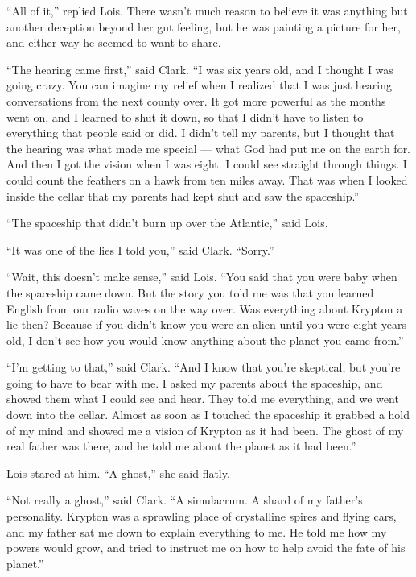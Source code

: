 ``All of it,'' replied Lois. There wasn't much reason to believe it was
anything but another deception beyond her gut feeling, but he was
painting a picture for her, and either way he seemed to want to share.

``The hearing came first,'' said Clark. ``I was six years old, and I
thought I was going crazy. You can imagine my relief when I realized
that I was just hearing conversations from the next county over. It got
more powerful as the months went on, and I learned to shut it down, so
that I didn't have to listen to everything that people said or did. I
didn't tell my parents, but I thought that the hearing was what made me
special --- what God had put me on the earth for. And then I got the
vision when I was eight. I could see straight through things. I could
count the feathers on a hawk from ten miles away. That was when I looked
inside the cellar that my parents had kept shut and saw the spaceship.''

``The spaceship that didn't burn up over the Atlantic,'' said Lois.

``It was one of the lies I told you,'' said Clark. ``Sorry.''

``Wait, this doesn't make sense,'' said Lois. ``You said that you were
baby when the spaceship came down. But the story you told me was that
you learned English from our radio waves on the way over. Was everything
about Krypton a lie then? Because if you didn't know you were an alien
until you were eight years old, I don't see how you would know anything
about the planet you came from.''

``I'm getting to that,'' said Clark. ``And I know that you're skeptical,
but you're going to have to bear with me. I asked my parents about the
spaceship, and showed them what I could see and hear. They told me
everything, and we went down into the cellar. Almost as soon as I
touched the spaceship it grabbed a hold of my mind and showed me a
vision of Krypton as it had been. The ghost of my real father was there,
and he told me about the planet as it had been.''

Lois stared at him. ``A ghost,'' she said flatly.

``Not really a ghost,'' said Clark. ``A simulacrum. A shard of my
father's personality. Krypton was a sprawling place of crystalline
spires and flying cars, and my father sat me down to explain everything
to me. He told me how my powers would grow, and tried to instruct me on
how to help avoid the fate of his planet.''

